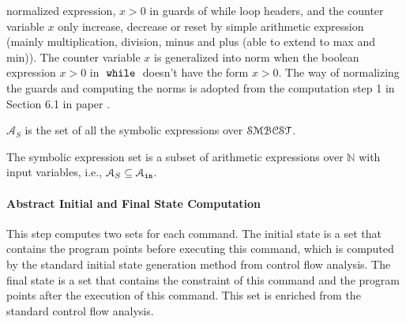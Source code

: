 normalized expression, $x > 0$
in guards of while loop headers, and 
the counter variable $x$ only increase, decrease or reset by 
simple arithmetic expression (mainly multiplication, division, minus and plus (able to extend to max and min)). 
The counter variable $x$ is generalized into norm when the boolean expression $x > 0$
in $\;\mathtt{while}\;$ doesn't have the form $x > 0$.
The way of normalizing the guards and computing the norms is adopted from the computation step 1 in Section 6.1 in paper \cite{sinn2017complexity}. 
\begin{defn}
  $\mathcal{A}_{S}$ is the set of all the symbolic expressions 
over $\mathcal{SMBCST}$.
\end{defn}
The symbolic expression set is a subset of arithmetic expressions over $\mathbb{N}$ with input variables, 
i.e., $\mathcal{A}_{S} \subseteq \mathcal{A}_{\mathtt{in}}$.
\paragraph{Abstract Initial and Final State Computation}
This step computes two sets for each command. 
The initial state is a set that contains the
program points before executing this command, which is computed by the standard initial state generation method from control flow analysis.
The final state is a set
that contains the constraint of this command and the program points after the execution of this command.
This set is enriched 
from the standard control flow analysis.

